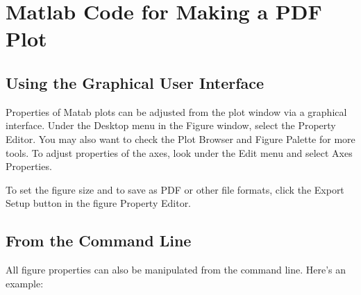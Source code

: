 \chapter[PDF Plots From Matlab]{Matlab Code for Making a PDF Plot}
\label{AppendixA}
\section{Using the Graphical User Interface}
Properties of Matab plots can be adjusted from the plot window via a graphical interface. Under the Desktop menu in the Figure window, select the Property Editor. You may also want to check the Plot Browser and Figure Palette for more tools. To adjust properties of the axes, look under the Edit menu and select Axes Properties.

To set the figure size and to save as PDF or other file formats, click the Export Setup button in the figure Property Editor.

\section{From the Command Line} 
All figure properties can also be manipulated from the command line. Here's an example: 
